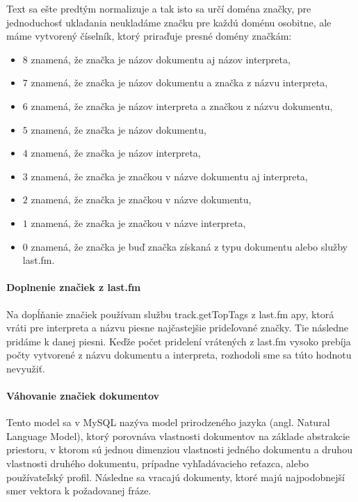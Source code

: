 Text sa ešte predtým normalizuje a tak isto sa určí doména značky, pre jednoduchosť 
ukladania neukladáme značku pre každú doménu osobitne, ale máme vytvorený číselník,
ktorý priraďuje presné domény značkám: 

\begin{itemize}
\item{\(8\) znamená, že značka je názov dokumentu aj názov interpreta,}
\item{\(7\) znamená, že značka je názov dokumentu a značka z názvu interpreta,}
\item{\(6\) znamená, že značka je názov interpreta a značkou z názvu dokumentu,}
\item{\(5\) znamená, že značka je názov dokumentu,}
\item{\(4\) znamená, že značka je názov interpreta,}
\item{\(3\) znamená, že značka je značkou v názve dokumentu aj interpreta,}
\item{\(2\) znamená, že značka je značkou v názve dokumentu,}
\item{\(1\) znamená, že značka je značkou v názve interpreta,}
\item{\(0\) znamená, že značka je buď značka získaná z typu dokumentu alebo služby last.fm.}
\end{itemize}

\paragraph{Doplnenie značiek z last.fm}

Na dopĺňanie značiek používam službu track.getTopTags z last.fm apy, ktorá 
vráti pre interpreta a názvu piesne najčastejšie prideľované značky. Tie následne
pridáme k danej piesni. Keďže počet pridelení vrátených z last.fm vysoko prebíja
počty vytvorené z názvu dokumentu a interpreta, rozhodoli sme sa túto hodnotu 
nevyužiť.

\paragraph{Váhovanie značiek dokumentov}

Tento model sa v MySQL nazýva model prirodzeného jazyka (angl. Natural Language Model),
ktorý porovnáva vlastnosti dokumentov na základe abstrakcie priestoru,
v ktorom sú jednou dimenziou vlastnosti jedného dokumentu a druhou vlastnosti druhého
dokumentu, prípadne vyhľadávacieho reťazca, alebo používateľský profil.
Následne sa vracajú dokumenty, ktoré majú najpodobnejší smer vektora k požadovanej fráze.

